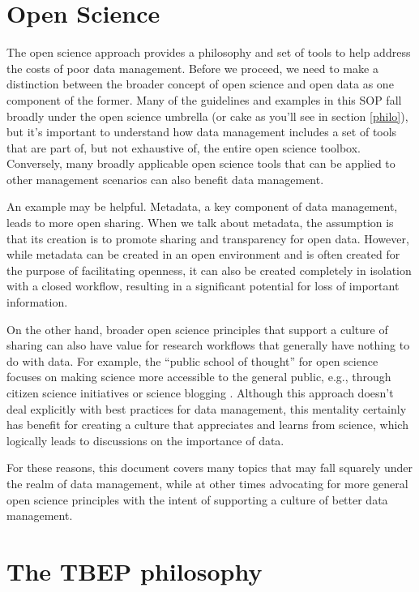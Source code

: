 \documentclass[
]{book}
\begin{document}
\section{Open Science}\label{opengeneral}

The open science approach provides a philosophy and set of tools to help address the costs of poor data management. Before we proceed, we need to make a distinction between the broader concept of open science and open data as one component of the former. Many of the guidelines and examples in this SOP fall broadly under the open science umbrella (or cake as you'll see in section \ref{philo}), but it's important to understand how data management includes a set of tools that are part of, but not exhaustive of, the entire open science toolbox. Conversely, many broadly applicable open science tools that can be applied to other management scenarios can also benefit data management.

An example may be helpful. Metadata, a key component of data management, leads to more open sharing. When we talk about metadata, the assumption is that its creation is to promote sharing and transparency for open data. However, while metadata can be created in an open environment and is often created for the purpose of facilitating openness, it can also be created completely in isolation with a closed workflow, resulting in a significant potential for loss of important information.

On the other hand, broader open science principles that support a culture of sharing can also have value for research workflows that generally have nothing to do with data. For example, the ``public school of thought'' for open science focuses on making science more accessible to the general public, e.g., through citizen science initiatives or science blogging \citep{Fecher14}. Although this approach doesn't deal explicitly with best practices for data management, this mentality certainly has benefit for creating a culture that appreciates and learns from science, which logically leads to discussions on the importance of data.

For these reasons, this document covers many topics that may fall squarely under the realm of data management, while at other times advocating for more general open science principles with the intent of supporting a culture of better data management.

\section{The TBEP philosophy}\label{philogeneral}
\end{document}
